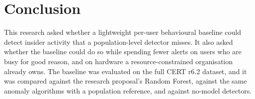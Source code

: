 \documentclass[a4paper,12pt]{article}
\begin{document}
\section{Conclusion}
\label{sec:conclusion}

This research asked whether a lightweight per-user behavioural baseline could detect insider activity that a population-level detector misses. It also asked whether the baseline could do so while spending fewer alerts on users who are busy for good reason, and on hardware a resource-constrained organisation already owns. The baseline was evaluated on the full CERT r6.2 dataset, and it was compared against the research proposal's Random Forest, against the same anomaly algorithms with a population reference, and against no-model detectors.
\end{document}
